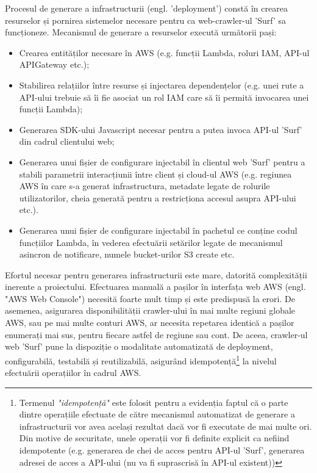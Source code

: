\newcommand{\descriereIdempotenta}{Termenul \textit{"idempotență"} este folosit pentru a evidenția faptul că o parte dintre operațiile efectuate de către mecanismul automatizat de generare a infrastructurii vor avea același rezultat dacă vor fi executate de mai multe ori. Din motive de securitate, unele operații vor fi definite explicit ca nefiind idempotente (e.g. generarea de chei de acces pentru API-ul 'Surf', generarea adresei de acces a API-ului (nu va fi suprascrisă în API-ul existent)) }

Procesul de generare a infrastructurii (engl. 'deployment') constă în crearea resurselor și pornirea sistemelor necesare pentru ca web-crawler-ul 'Surf' sa funcționeze. Mecanismul de generare a resurselor execută următorii pași:

\begin{itemize}

	\item{Crearea entităților necesare în AWS (e.g. funcții Lambda, roluri IAM, API-ul APIGateway etc.);}
	
	\item{Stabilirea relațiilor între resurse și injectarea dependențelor (e.g. unei rute a API-ului trebuie să îi fie asociat un rol IAM care să îi permită invocarea unei funcții Lambda);}
	
	\item{Generarea SDK-ului Javascript necesar pentru a putea invoca API-ul 'Surf' din cadrul clientului web;}
	
	\item{Generarea unui fișier de configurare injectabil în clientul web 'Surf' pentru a stabili parametrii interacțiunii între client și cloud-ul AWS (e.g. regiunea AWS în care s-a generat infrastructura, metadate legate de rolurile utilizatorilor, cheia generată pentru a restricționa accesul asupra API-ului etc.).}

  \item{Generarea unui fișier de configurare injectabil în pachetul ce conține codul funcțiilor Lambda, în vederea efectuării setărilor legate de mecanismul asincron de notificare, numele bucket-urilor S3 create etc.}
\end{itemize}

\noindent
Efortul necesar pentru generarea infrastructurii este mare, datorită complexității inerente a proiectului. Efectuarea manuală a pașilor în interfața web AWS (engl. "AWS Web Console") necesită foarte mult timp și este predispusă la erori. De asemenea, asigurarea disponibilității crawler-ului în mai multe regiuni globale AWS, sau pe mai multe conturi AWS, ar necesita repetarea identică a pașilor enumerați mai sus, pentru fiecare astfel de regiune sau cont. De aceea, crawler-ul web 'Surf' pune la dispoziție o modalitate automatizată de deployment, configurabilă, testabilă și reutilizabilă, asigurând idempotență\footnote{\descriereIdempotenta} la nivelul efectuării operațiilor în cadrul AWS.
\\

